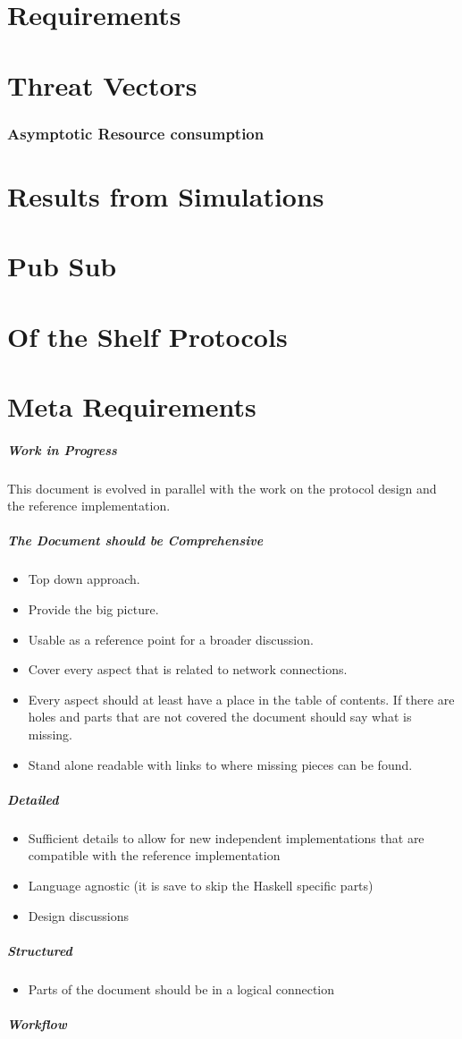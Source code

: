 \documentclass{report}
\theoremstyle{definition}{
  \newtheorem{lemma}{Lemma}[section] %
  \newtheorem{definition}[lemma]{Definition}
}
\theoremstyle{theorem}{
  \newtheorem{invariant}[lemma]{Invariant}
  \newtheorem{proofobligation}[lemma]{Proof Obligation}
}
\numberwithin{equation}{lemma}
\begin{document}
\section{Requirements}
\section{Threat Vectors}
\subsubsection{Asymptotic Resource consumption}
\section{Results from Simulations}
\section{Pub Sub}
\section{Of the Shelf Protocols}
\section{Meta Requirements}
\subparagraph{Work in Progress}
This document is evolved in parallel with the work on the protocol design and
the reference implementation.

\subparagraph{The Document should be Comprehensive}
\begin{itemize}
\item Top down approach.
\item Provide the big picture.
\item Usable as a reference point for a broader discussion.
\item Cover every aspect that is related to network connections.
\item Every aspect should at least have a place in the table of contents.
  If there are holes and parts that are not covered the document should say what is missing.
\item Stand alone readable with links to where missing pieces can be found.
\end{itemize}

\subparagraph{Detailed}
\begin{itemize}
\item Sufficient details to allow for new independent implementations that are compatible with
the reference implementation
\item Language agnostic (it is save to skip the Haskell specific parts)
\item Design discussions
\end{itemize}
\subparagraph{Structured}
\begin{itemize}
\item Parts of the document should be in a logical connection
\end{itemize}
\subparagraph{Workflow}




\appendix
\end{document}

